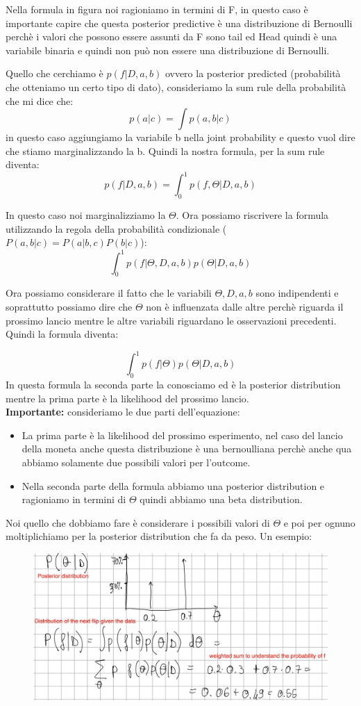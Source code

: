 \documentclass[14pt]{extreport}
\begin{document}
Nella formula in figura noi ragioniamo in termini di F, in questo caso è importante capire che questa posterior predictive è una distribuzione di
Bernoulli perchè i valori che possono essere assunti da F sono tail ed Head quindi è una variabile binaria e quindi non può non essere una
distribuzione di Bernoulli.

Quello che cerchiamo è $p(f|D, a,b)$ ovvero la posterior predicted (probabilità che otteniamo un certo tipo di dato), consideriamo la sum rule della
probabilità che mi dice che:
$$p(a|c) = \int p(a,b|c)$$ in questo caso aggiungiamo la variabile b nella joint probability e questo vuol dire che stiamo marginalizzando la b.
Quindi la nostra formula, per la sum rule diventa: $$p(f|D, a,b) = \int_0^1p(f,\Theta|D,a,b)$$

In questo caso noi marginalizziamo la $\Theta$. Ora possiamo riscrivere la formula utilizzando la regola della probabilità condizionale ($P(a,b|c) =
P(a|b,c)P(b|c)$):
$$\int_0^1p(f|\Theta,D,a,b)p(\Theta|D,a,b)$$

Ora possiamo considerare il fatto che le variabili $\Theta,D,a,b$ sono indipendenti e soprattutto possiamo dire che $\Theta$ non è influenzata dalle
altre perchè riguarda il prossimo lancio mentre le altre variabili riguardano le osservazioni precedenti. Quindi la formula diventa:

 $$\int_0^1p(f|\Theta)p(\Theta|D,a,b)$$ In questa formula la seconda parte la conosciamo ed è la posterior distribution mentre la prima parte è la
 likelihood del prossimo lancio. \\
\textbf{Importante:} consideriamo le due parti dell'equazione:
\begin{itemize}
\item La prima parte è la likelihood del prossimo esperimento, nel caso del lancio della moneta anche questa distribuzione è una bernoulliana perchè
anche qua abbiamo solamente due possibili valori per l'outcome.
\item Nella seconda parte della formula abbiamo una posterior distribution e ragioniamo in termini di $\Theta$ quindi abbiamo una beta distribution.
\end{itemize} 


Noi quello che dobbiamo fare è considerare i possibili valori di $\Theta$ e poi per ognuno moltiplichiamo per la posterior distribution che fa da
peso. Un esempio:
\begin{figure}[H]
\centering
\includegraphics[width=0.7\linewidth]{49.jpeg}
\end{figure}
\end{document}

